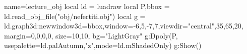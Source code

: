 \begin{luadraw}{name=lecture_obj}
local ld = luadraw
local P,bbox = ld.read_obj_file("obj/nefertiti.obj")
local g = ld.graph3d:new{window3d=bbox,window={-6,5,-7,7},viewdir={"central",35,65,20},
margin={0,0,0,0}, size={10,10}, bg="LightGray"}
g:Dpoly(P, {usepalette={ld.palAutumn,"z"},mode=ld.mShadedOnly})
g:Show()
\end{luadraw}
